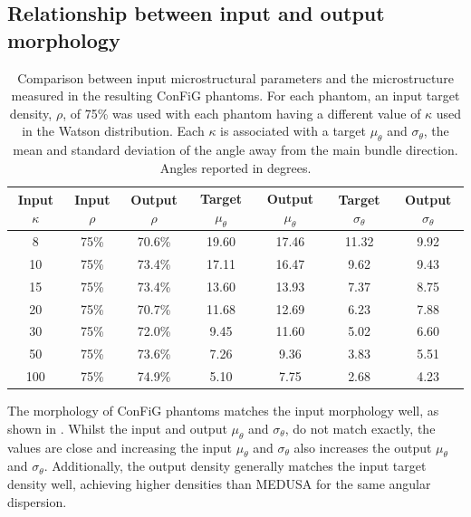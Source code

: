 \subsection{Relationship between input and output morphology}
\label{sec:config_result_input_output_rel}
\begin{table}[]
\caption{Comparison between input microstructural parameters and the microstructure measured in the resulting \ac{ConFiG} phantoms. For each phantom, an input target density, $\rho$, of 75\% was used with each phantom having a different value of $\kappa$ used in the Watson distribution. Each $\kappa$ is associated with a target $\mu_\theta$ and $\sigma_\theta$, the mean and standard deviation of the angle away from the main bundle direction. Angles reported in degrees.}
\label{tab:micro_input_vs_output}
\begin{tabular}{ccccccc}
  \toprule
  Input $\kappa$ & Input $\rho$ & Output $\rho$ & Target $\mu_\theta$ & Output $\mu_\theta$ & Target $\sigma_\theta$ & Output $\sigma_\theta$\\\midrule
8        & 75\%     & 70.6\%    & 19.60     & 17.46     & 11.32     & 9.92   \\
10       & 75\%     & 73.4\%    & 17.11     & 16.47     & 9.62      & 9.43   \\
15       & 75\%     & 73.4\%    & 13.60     & 13.93     & 7.37      & 8.75   \\
20       & 75\%     & 70.7\%    & 11.68     & 12.69     & 6.23      & 7.88   \\
30       & 75\%     & 72.0\%    & 9.45      & 11.60     & 5.02      & 6.60   \\
50       & 75\%     & 73.6\%    & 7.26      & 9.36      & 3.83      & 5.51   \\
100      & 75\%     & 74.9\%    & 5.10      & 7.75      & 2.68      & 4.23 \\\bottomrule
\end{tabular}
\end{table}

The morphology of \ac{ConFiG} phantoms matches the input morphology well, as shown in . Whilst the input and output $\mu_\theta$ and $\sigma_\theta$, do not match exactly, the values are close and increasing the input $\mu_\theta$ and $\sigma_\theta$ also increases the output $\mu_\theta$ and $\sigma_\theta$. Additionally, the output density generally matches the input target density well, achieving higher densities than MEDUSA for the same angular dispersion.


